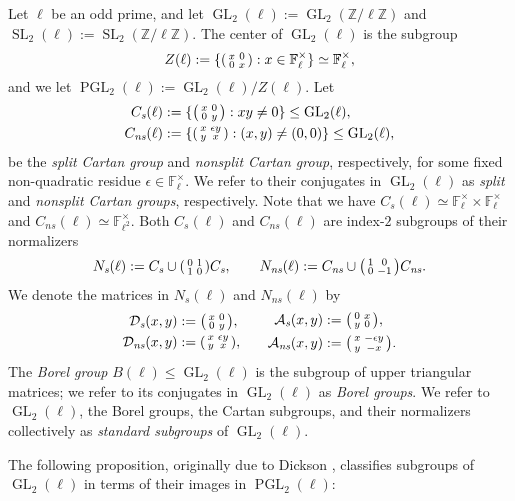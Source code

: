 \documentclass[table,dvipsnames]{amsart}
\newcommand{\F}{\mathbb{F}}
\newcommand{\SL}{\operatorname{SL}}
\newcommand{\GL}{\operatorname{GL}}
\newcommand{\PGL}{\operatorname{PGL}}
\newcommand{\Z}{\mathbb{Z}}
\newcommand{\smallmat}[4]{\begin{psmallmatrix}#1&#2\\#3&#4\end{psmallmatrix}}
\numberwithin{equation}{section}
\newcommand{\s}{\textit{s}}
\newcommand{\ns}{\textit{ns}}
\newcommand{\Cs}{C_\s}
\newcommand{\Cns}{C_\ns}
\newcommand{\Ns}{N_\s}
\newcommand{\Nns}{N_\ns}
\begin{document}
Let $\ell$ be an odd prime, and let $\GL_2(\ell):=\GL_2(\Z/\ell\Z)$ and $\SL_2(\ell):=\SL_2(\Z/\ell\Z)$. The center of $\GL_2(\ell)$ is the subgroup
\begin{equation*}
Z(\ell):=\{\smallmat{x}{0}{0}{x}:x\in\F_\ell^\times\}\simeq\F_\ell^\times,
\end{equation*}
and we let $\PGL_2(\ell):=\GL_2(\ell)/Z(\ell)$. Let
\begin{align*}
\Cs(\ell)&:=\{\smallmat{x}{0}{0}{y}:xy\ne 0\}\le\GL_2(\ell),\\
\Cns(\ell)&:=\{\smallmat{x}{\epsilon y}{y}{x}:(x,y)\ne(0,0)\}\le\GL_2(\ell),
\end{align*}
be the \emph{split Cartan group} and \emph{nonsplit Cartan group}, respectively, for some fixed non-quadratic residue $\epsilon\in\F_\ell^\times$. We refer to their conjugates in $\GL_2(\ell)$ as \emph{split} and \emph{nonsplit Cartan groups}, respectively. Note that we have $\Cs(\ell)\simeq\F_\ell^\times\times\F_\ell^\times$ and $\Cns(\ell)\simeq\F_{\ell^2}^\times$. Both $\Cs(\ell)$ and $\Cns(\ell)$ are index-$2$ subgroups of their normalizers
\begin{equation*}
\Ns(\ell):=\Cs\cup\smallmat{0}{1}{1}{0}\Cs,\qquad\Nns(\ell):=\Cns\cup\smallmat{1}{0}{0}{-1}\Cns.
\end{equation*}
We denote the matrices in $\Ns(\ell)$ and $\Nns(\ell)$ by
\begin{equation*}
\begin{aligned}
\mathcal{D}_\s(x,y)&:=\smallmat{x}{0}{0}{y},\\
\mathcal{D}_\ns(x,y)&:=\smallmat{x}{\epsilon y}{y}{x},
\end{aligned}
\qquad
\begin{aligned}
\mathcal{A}_\s(x,y)&:=\smallmat{0}{x}{y}{0},\\
\mathcal{A}_\ns(x,y)&:=\smallmat{x}{-\epsilon y}{y}{-x}.
\end{aligned}
\end{equation*}
The \emph{Borel group} $B(\ell)\le\GL_2(\ell)$ is the subgroup of upper triangular matrices; we refer to its conjugates in $\GL_2(\ell)$ as \emph{Borel groups}. We refer to $\GL_2(\ell)$, the Borel groups, the Cartan subgroups, and their normalizers collectively as \emph{standard subgroups} of $\GL_2(\ell)$.

The following proposition, originally due to Dickson \cite{dickson1901}, classifies subgroups of $\GL_2(\ell)$ in terms of their images in $\PGL_2(\ell)$:
\end{document}
